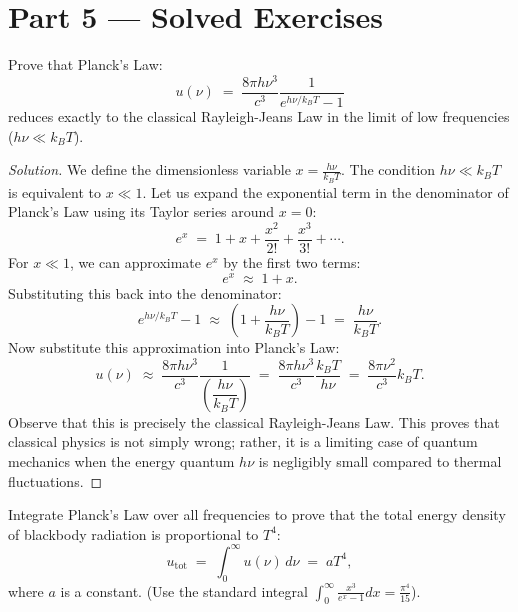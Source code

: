 \documentclass[12pt, a4paper, twoside]{book}
\begin{document}
\section{Part 5 --- Solved Exercises}

\begin{exercise}
Prove that Planck's Law:
\[
  u(\nu) \;=\; \frac{8\pi h \nu^3}{c^3} \frac{1}{e^{h\nu/k_B T} - 1}
\]
reduces exactly to the classical Rayleigh-Jeans Law in the limit of low frequencies ($h\nu \ll k_B T$).
\end{exercise}

\begin{proof}[Solution]
We define the dimensionless variable $x = \frac{h\nu}{k_B T}$. The condition $h\nu \ll k_B T$ is equivalent to $x \ll 1$.
Let us expand the exponential term in the denominator of Planck's Law using its Taylor series around $x = 0$:
\[
  e^x \;=\; 1 + x + \frac{x^2}{2!} + \frac{x^3}{3!} + \cdots.
\]
For $x \ll 1$, we can approximate $e^x$ by the first two terms:
\[
  e^x \;\approx\; 1 + x.
\]
Substituting this back into the denominator:
\[
  e^{h\nu/k_B T} - 1 \;\approx\; \left(1 + \frac{h\nu}{k_B T}\right) - 1 \;=\; \frac{h\nu}{k_B T}.
\]
Now substitute this approximation into Planck's Law:
\[
  u(\nu) \;\approx\; \frac{8\pi h \nu^3}{c^3} \frac{1}{\left( \dfrac{h\nu}{k_B T} \right)} \;=\; \frac{8\pi h \nu^3}{c^3} \frac{k_B T}{h\nu} \;=\; \frac{8\pi \nu^2}{c^3} k_B T.
\]
Observe that this is precisely the classical Rayleigh-Jeans Law. This proves that classical physics is not simply wrong; rather, it is a limiting case of quantum mechanics when the energy quantum $h\nu$ is negligibly small compared to thermal fluctuations.
\end{proof}

\begin{exercise}
Integrate Planck's Law over all frequencies to prove that the total energy density of blackbody radiation is proportional to $T^4$:
\[
  u_{\text{tot}} \;=\; \int_0^\infty u(\nu) \, d\nu \;=\; a T^4,
\]
where $a$ is a constant. (Use the standard integral $\int_0^\infty \frac{x^3}{e^x - 1} dx = \frac{\pi^4}{15}$).
\end{exercise}
\end{document}
